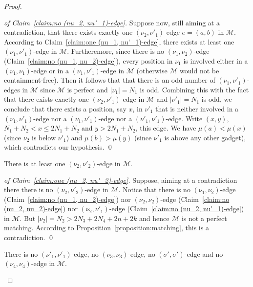 \documentclass[a4paper,10pt]{llncs}
\begin{document}
\begin{proof}
\begin{proof}[of Claim~\ref{claim:no (nu_2, nu'_1)-edge}]
    Suppose now, still aiming at a contradiction, that there exists
    exactly one $(\nu_2, \nu'_1)$-edge $e = (a, b)$ in $\mathcal{M}$.
    According to Claim~\ref{claim:one (nu_1, nu'_1)-edge}, there exists at least
    one $(\nu_1, \nu'_1)$-edge in $\mathcal{M}$.
    Furtheremore, since
    there is no $(\nu_1, \nu_2)$-edge (Claim~\ref{claim:no (nu_1, nu_2)-edge}),
    every position in $\nu_1$ is involved either in a
    $(\nu_1, \nu_1)$-edge or in a $(\nu_1, \nu'_1)$-edge in $\mathcal{M}$
    (otherwise $\mathcal{M}$ would not be containment-free).
    Then it follows that that there is an odd number of $(\nu_1, \nu'_1)$-edges
    in $\mathcal{M}$ since $\mathcal{M}$ is perfect and $|\nu_1| = N_1$ is odd.
    Combining this with the fact that there exists exactly one $(\nu_2, \nu'_1)$-edge
    in $\mathcal{M}$ and $|\nu'_1| = N_1$ is odd,
    we conclude that there exists a position, say $x$, in $\nu'_1$
    that is neither involved in a $(\nu_1, \nu'_1)$-edge nor a $(\nu_1, \nu'_1)$-edge
    nor a $(\nu'_1, \nu'_1)$-edge.
    Write $(x, y)$, $N_1+N_2 < x \leq 2N_1 + N_2$ and $y > 2N_1 + N_2$, this edge.
    We have $\mu(a) < \mu(x)$ (since $\nu_2$ is below $\nu'_1$)
    and $\mu(b) > \mu(y)$ (since $\nu'_1$ is above any other gadget),
    which contradicts our hypothesis.
    \qed
  \end{proof}

  \begin{claim}
    \label{claim:one (nu_2, nu'_2)-edge}
    There is at least one $(\nu_2, \nu'_2)$-edge in $\mathcal{M}$.
  \end{claim}

  \begin{proof}[of Claim~\ref{claim:one (nu_2, nu'_2)-edge}]
    Suppose, aiming at a contradiction there there is no
    $(\nu_2, \nu'_2)$-edge in $\mathcal{M}$.
    Notice that there is no
    $(\nu_1, \nu_2)$-edge (Claim~\ref{claim:no (nu_1, nu_2)-edge})
    nor $(\nu_2, \nu_2)$-edge (Claim~\ref{claim:no (nu_2, nu_2)-edge})
    nor $(\nu_2, \nu'_1)$-edge (Claim~\ref{claim:no (nu_2, nu'_1)-edge})
    in $\mathcal{M}$.
    But $|\nu_2| = N_2 > 2N_3 + 2N_4 + 2n + 2k$ and hence $\mathcal{M}$ is not
    a perfect matching.
    According to Proposition~\ref{proposition:matching}, this is
    a contradiction.
    \qed
  \end{proof}

  \begin{claim}
    \label{claim:no (nu'_1, nu'_1),(nu_3, nu_3),(sigma' ,sigma'),(nu_4, nu_4)-edge}
    There is
    no $(\nu'_1, \nu'_1)$-edge,
    no $(\nu_3, \nu_3)$-edge,
    no $(\sigma', \sigma')$-edge and
    no $(\nu_4, \nu_4)$-edge
    in $\mathcal{M}$.
  \end{claim}


\end{proof}
\end{document}
